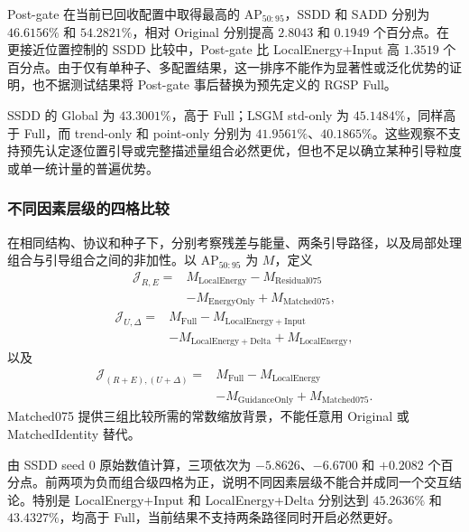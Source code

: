 \documentclass[journal]{IEEEtran}
\begin{document}
Post-gate 在当前已回收配置中取得最高的 $\mathrm{AP}_{50:95}$，SSDD 和 SADD 分别为 $46.6156\%$ 和 $54.2821\%$，相对 Original 分别提高 $2.8043$ 和 $0.1949$ 个百分点。在更接近位置控制的 SSDD 比较中，Post-gate 比 LocalEnergy+Input 高 $1.3519$ 个百分点。由于仅有单种子、多配置结果，这一排序不能作为显著性或泛化优势的证明，也不据测试结果将 Post-gate 事后替换为预先定义的 RGSP Full。

SSDD 的 Global 为 $43.3001\%$，高于 Full；LSGM std-only 为 $45.1484\%$，同样高于 Full，而 trend-only 和 point-only 分别为 $41.9561\%$、$40.1865\%$。这些观察不支持预先认定逐位置引导或完整描述量组合必然更优，但也不足以确立某种引导粒度或单一统计量的普遍优势。

\subsubsection{不同因素层级的四格比较}

在相同结构、协议和种子下，分别考察残差与能量、两条引导路径，以及局部处理组合与引导组合之间的非加性。以 $\mathrm{AP}_{50:95}$ 为 $M$，定义
\begin{equation}
\begin{aligned}
\mathcal{J}_{R,E}
={}&M_{\mathrm{LocalEnergy}}-M_{\mathrm{Residual075}}\\
&-M_{\mathrm{EnergyOnly}}+M_{\mathrm{Matched075}},
\end{aligned}
\label{eq:interaction_re}
\end{equation}
\begin{equation}
\begin{aligned}
\mathcal{J}_{U,\Delta}
={}&M_{\mathrm{Full}}-M_{\mathrm{LocalEnergy+Input}}\\
&-M_{\mathrm{LocalEnergy+Delta}}+M_{\mathrm{LocalEnergy}},
\end{aligned}
\label{eq:interaction_ud}
\end{equation}
以及
\begin{equation}
\begin{aligned}
\mathcal{J}_{(R+E),(U+\Delta)}
={}&M_{\mathrm{Full}}-M_{\mathrm{LocalEnergy}}\\
&-M_{\mathrm{GuidanceOnly}}+M_{\mathrm{Matched075}}.
\end{aligned}
\label{eq:interaction_combined}
\end{equation}
Matched075 提供三组比较所需的常数缩放背景，不能任意用 Original 或 MatchedIdentity 替代。

由 SSDD seed 0 原始数值计算，三项依次为 $-5.8626$、$-6.6700$ 和 $+0.2082$ 个百分点。前两项为负而组合级四格为正，说明不同因素层级不能合并成同一个交互结论。特别是 LocalEnergy+Input 和 LocalEnergy+Delta 分别达到 $45.2636\%$ 和 $43.4327\%$，均高于 Full，当前结果不支持两条路径同时开启必然更好。
\end{document}
